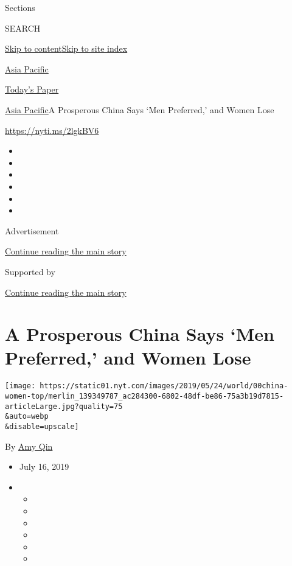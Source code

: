 Sections

SEARCH

\protect\hyperlink{site-content}{Skip to
content}\protect\hyperlink{site-index}{Skip to site index}

\href{https://www.nytimes.com/section/world/asia}{Asia Pacific}

\href{https://myaccount.nytimes.com/auth/login?response_type=cookie\&client_id=vi}{}

\href{https://www.nytimes.com/section/todayspaper}{Today's Paper}

\href{/section/world/asia}{Asia Pacific}\textbar{}A Prosperous China
Says `Men Preferred,' and Women Lose

\url{https://nyti.ms/2lgkBV6}

\begin{itemize}
\item
\item
\item
\item
\item
\item
\end{itemize}

Advertisement

\protect\hyperlink{after-top}{Continue reading the main story}

Supported by

\protect\hyperlink{after-sponsor}{Continue reading the main story}

\hypertarget{a-prosperous-china-says-men-preferred-and-women-lose}{%
\section{A Prosperous China Says `Men Preferred,' and Women
Lose}\label{a-prosperous-china-says-men-preferred-and-women-lose}}

\texttt{[image: https://static01.nyt.com/images/2019/05/24/world/00china-women-top/merlin\_139349787\_ac284300-6802-48df-be86-75a3b19d7815-articleLarge.jpg?quality=75\\\&auto=webp\\\&disable=upscale]}

By \href{https://www.nytimes.com/by/amy-qin}{Amy Qin}

\begin{itemize}
\item
  July 16, 2019
\item
  \begin{itemize}
  \item
  \item
  \item
  \item
  \item
  \item
  \end{itemize}
\end{itemize}

